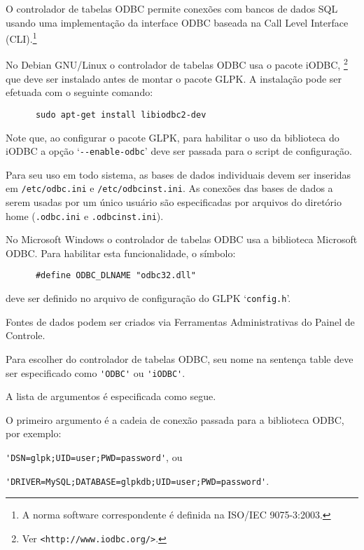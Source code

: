 \documentclass[11pt, brazil]{report}
\def\para#1{\noindent{\bf#1}}
\begin{document}
O controlador de tabelas ODBC permite conexões com bancos de dados SQL usando
uma \linebreak implementação da interface ODBC baseada na Call Level Interface
(CLI).\footnote{A norma software correspondente é definida na
ISO/IEC 9075-3:2003.}

\para{Debian GNU/Linux.}
No Debian GNU/Linux o controlador de tabelas ODBC usa o pacote iODBC,
\footnote{Ver {\tt<http://www.iodbc.org/>}.} que deve ser instalado antes
de montar o pacote GLPK. A instalação pode ser efetuada com o seguinte
comando:

\begin{verbatim}
      sudo apt-get install libiodbc2-dev
\end{verbatim}

Note que, ao configurar o pacote GLPK, para habilitar o uso da biblioteca do iODBC
a opção `\verb|--enable-odbc|' deve ser passada para o script de configuração.

Para seu uso em todo sistema, as bases de dados individuais devem ser inseridas em
\verb|/etc/odbc.ini| e \verb|/etc/odbcinst.ini|. As conexões das bases de dados
a serem usadas por um único usuário são especificadas por arquivos do diretório
home (\verb|.odbc.ini| e \verb|.odbcinst.ini|).

\para{Microsoft Windows.}
No Microsoft Windows o controlador de tabelas ODBC usa a biblioteca Microsoft ODBC.
Para habilitar esta funcionalidade, o símbolo:

\begin{verbatim}
      #define ODBC_DLNAME "odbc32.dll"
\end{verbatim}

\noindent
deve ser definido no arquivo de configuração do GLPK `\verb|config.h|'.

Fontes de dados podem ser criados via Ferramentas Administrativas do
Painel de Controle.

Para escolher do controlador de tabelas ODBC, seu nome na sentença table deve
ser especificado como \verb|'ODBC'| ou \verb|'iODBC'|.


A lista de argumentos é especificada como segue.

O primeiro argumento é a cadeia de conexão passada para a biblioteca ODBC,
por exemplo:

\verb|'DSN=glpk;UID=user;PWD=password'|, ou

\verb|'DRIVER=MySQL;DATABASE=glpkdb;UID=user;PWD=password'|.
\end{document}
